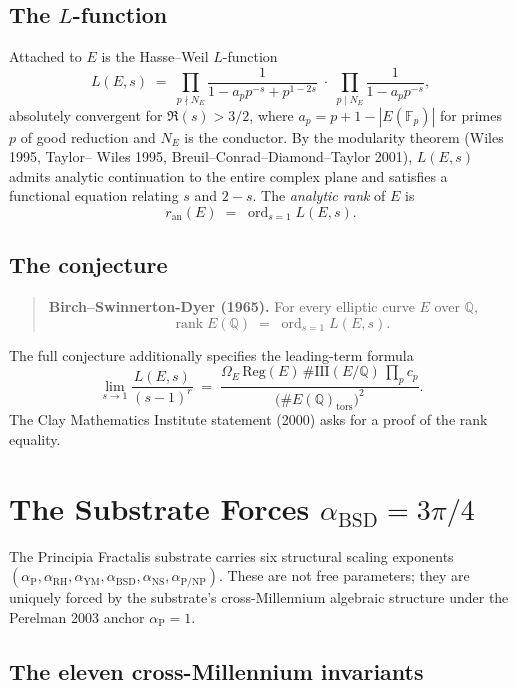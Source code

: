 \documentclass[11pt,a4paper]{article}
\theoremstyle{plain}
\theoremstyle{definition}
\theoremstyle{remark}
\newcommand{\Q}{\mathbb{Q}}
\newcommand{\rank}{\operatorname{rank}}
\newcommand{\ord}{\operatorname{ord}}
\newcommand{\Sha}{\mathrm{III}}
\begin{document}
\subsection{The $L$-function}

Attached to $E$ is the Hasse--Weil $L$-function
\[
L(E, s) \;=\; \prod_{p \nmid N_{E}}
   \frac{1}{1 - a_{p} p^{-s} + p^{1-2s}}
   \;\cdot\;\prod_{p \mid N_{E}}
   \frac{1}{1 - a_{p} p^{-s}},
\]
absolutely convergent for $\Re(s) > 3/2$, where $a_{p} = p + 1 -
|E(\mathbb{F}_{p})|$ for primes $p$ of good reduction and $N_{E}$
is the conductor. By the modularity theorem (Wiles 1995, Taylor--
Wiles 1995, Breuil--Conrad--Diamond--Taylor 2001), $L(E, s)$ admits
analytic continuation to the entire complex plane and satisfies a
functional equation relating $s$ and $2 - s$. The
\emph{analytic rank} of $E$ is
\[
r_{\mathrm{an}}(E) \;=\; \ord_{s = 1} L(E, s).
\]

\subsection{The conjecture}

\begin{quote}
\textbf{Birch--Swinnerton-Dyer (1965).}
For every elliptic curve $E$ over $\Q$,
\[
\rank E(\Q) \;=\; \ord_{s = 1} L(E, s).
\]
\end{quote}
The full conjecture additionally specifies the leading-term
formula
\[
\lim_{s \to 1} \frac{L(E, s)}{(s - 1)^{r}}
  \;=\;
  \frac{\Omega_{E}\,\mathrm{Reg}(E)\,\#\Sha(E/\Q)\,
        \prod_{p} c_{p}}
       {\bigl(\#E(\Q)_{\mathrm{tors}}\bigr)^{2}}.
\]
The Clay Mathematics Institute statement (2000) asks for a proof
of the rank equality.

\section{The Substrate Forces $\alpha_{\mathrm{BSD}} = 3\pi/4$}
\label{sec:alpha}

The Principia Fractalis substrate carries six structural scaling
exponents
$(\alpha_{\mathrm{P}}, \alpha_{\mathrm{RH}}, \alpha_{\mathrm{YM}},
\alpha_{\mathrm{BSD}}, \alpha_{\mathrm{NS}},
\alpha_{\mathrm{P/NP}})$.
These are not free parameters; they are uniquely forced by the
substrate's cross-Millennium algebraic structure under the
Perelman 2003 anchor $\alpha_{\mathrm{P}} = 1$.

\subsection{The eleven cross-Millennium invariants}
\end{document}
